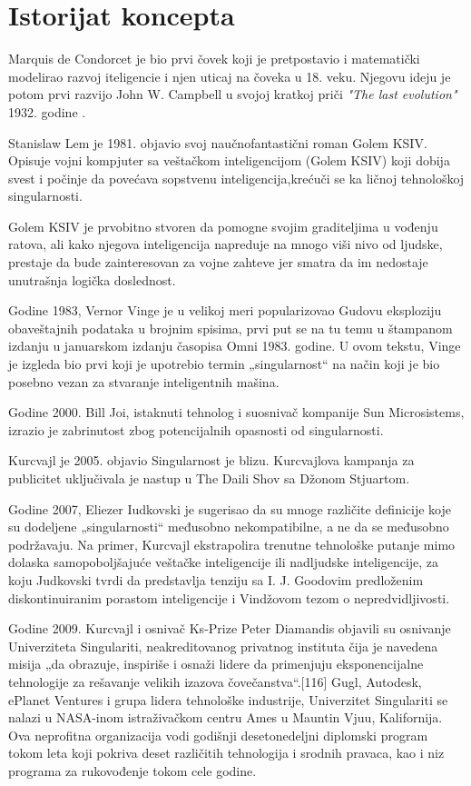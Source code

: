 \documentclass[a4paper]{article}
\begin{document}
\section{Istorijat koncepta}
\label{sec:istorijat}

Marquis de Condorcet je bio prvi čovek koji je pretpostavio i matematički modelirao razvoj iteligencie i njen uticaj na čoveka u 18. veku. Njegovu ideju je potom prvi razvijo John W. Campbell u svojoj kratkoj priči\textit{ "The last evolution"} 1932. godine .\cite{refe7}

Stanislaw Lem je 1981. objavio svoj naučnofantastični roman Golem KSIV. Opisuje vojni kompjuter sa veštačkom inteligencijom (Golem KSIV) koji dobija svest i počinje da povećava sopstvenu inteligencija,krećuči se ka ličnoj tehnološkoj singularnosti.\cite{refe8}


Golem KSIV je prvobitno stvoren da pomogne svojim graditeljima u vođenju ratova, ali kako njegova inteligencija napreduje na mnogo viši nivo od ljudske, prestaje da bude zainteresovan za vojne zahteve jer smatra da im nedostaje unutrašnja logička doslednost.

Godine 1983, Vernor Vinge je u velikoj meri popularizovao Gudovu eksploziju obaveštajnih podataka u brojnim spisima, prvi put se na tu temu u štampanom izdanju u januarskom izdanju časopisa Omni 1983. godine. U ovom tekstu, Vinge je izgleda bio prvi koji je upotrebio termin „singularnost“ na način koji je bio posebno vezan za stvaranje inteligentnih mašina.\cite{refe9}

Godine 2000. Bill Joi, istaknuti tehnolog i suosnivač kompanije Sun Microsistems, izrazio je zabrinutost zbog potencijalnih opasnosti od singularnosti.\cite{refe10}

Kurcvajl je 2005. objavio Singularnost je blizu. Kurcvajlova kampanja za publicitet uključivala je nastup u The Daili Shov sa Džonom Stjuartom.\cite{refe11}

Godine 2007, Eliezer Iudkovski je sugerisao da su mnoge različite definicije koje su dodeljene „singularnosti“ međusobno nekompatibilne, a ne da se međusobno podržavaju. Na primer, Kurcvajl ekstrapolira trenutne tehnološke putanje mimo dolaska samopoboljšajuće veštačke inteligencije ili nadljudske inteligencije, za koju Judkovski tvrdi da predstavlja tenziju sa I. J. Goodovim predloženim diskontinuiranim porastom inteligencije i Vindžovom tezom o nepredvidljivosti.\cite{refe12}\cite{refe13}

Godine 2009. Kurcvajl i osnivač Ks-Prize Peter Diamandis objavili su osnivanje Univerziteta Singulariti, neakreditovanog privatnog instituta čija je navedena misija „da obrazuje, inspiriše i osnaži lidere da primenjuju eksponencijalne tehnologije za rešavanje velikih izazova čovečanstva“.[116] Gugl, Autodesk, ePlanet Ventures i grupa lidera tehnološke industrije, Univerzitet Singulariti se nalazi u NASA-inom istraživačkom centru Ames u Mauntin Vjuu, Kalifornija. Ova neprofitna organizacija vodi godišnji desetonedeljni diplomski program tokom leta koji pokriva deset različitih tehnologija i srodnih pravaca, kao i niz programa za rukovođenje tokom cele godine.\cite{refe14}
\end{document}
